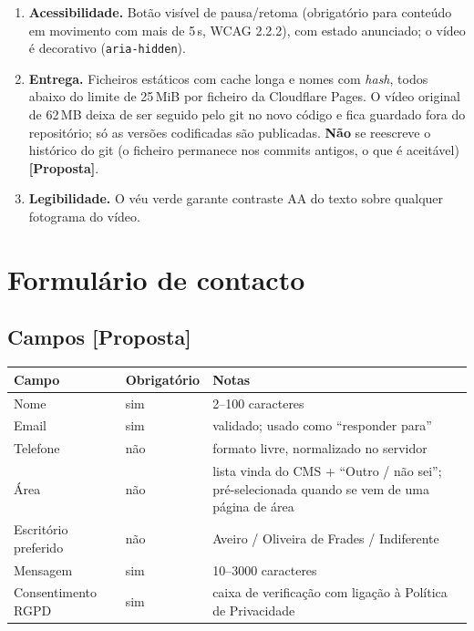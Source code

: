 \documentclass[11pt,a4paper]{article}
\newcommand{\proposta}{\textcolor{bronze}{\textbf{[Proposta]}}}
\begin{document}
\begin{enumerate}
  \item \textbf{Acessibilidade.} Botão visível de pausa/retoma (obrigatório para conteúdo em movimento com mais de 5\,s, WCAG 2.2.2), com estado anunciado; o vídeo é decorativo (\texttt{aria-hidden}).
  \item \textbf{Entrega.} Ficheiros estáticos com cache longa e nomes com \textit{hash}, todos abaixo do limite de 25\,MiB por ficheiro da Cloudflare Pages. O vídeo original de 62\,MB deixa de ser seguido pelo git no novo código e fica guardado fora do repositório; só as versões codificadas são publicadas. \textbf{Não} se reescreve o histórico do git (o ficheiro permanece nos commits antigos, o que é aceitável) \proposta.
  \item \textbf{Legibilidade.} O véu verde garante contraste AA do texto sobre qualquer fotograma do vídeo.
\end{enumerate}

\section{Formulário de contacto}\label{sec:form}

\subsection{Campos \proposta}
\begin{center}
\begin{tabularx}{\textwidth}{llX}
\toprule
\textbf{Campo} & \textbf{Obrigatório} & \textbf{Notas} \\
\midrule
Nome & sim & 2--100 caracteres \\
Email & sim & validado; usado como ``responder para'' \\
Telefone & não & formato livre, normalizado no servidor \\
Área & não & lista vinda do CMS + ``Outro / não sei''; pré-selecionada quando se vem de uma página de área \\
Escritório preferido & não & Aveiro / Oliveira de Frades / Indiferente \\
Mensagem & sim & 10--3000 caracteres \\
Consentimento RGPD & sim & caixa de verificação com ligação à Política de Privacidade \\
\bottomrule
\end{tabularx}
\end{center}
\end{document}
